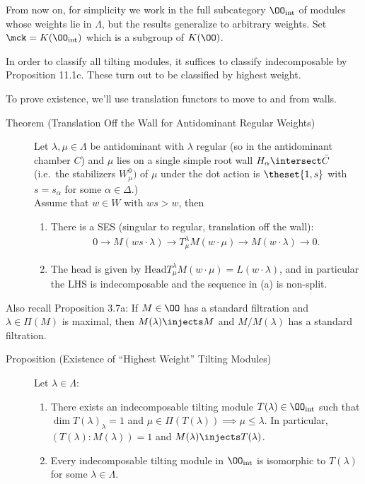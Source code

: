 From now on, for simplicity we work in the full subcategory
\(\OO_{\text{int}}\) of modules whose weights lie in \(\Lambda\), but
the results generalize to arbitrary weights. Set
\(\mck = K(\OO_{\text{int}})\) which is a subgroup of \(K(\OO)\).

In order to classify all tilting modules, it suffices to classify
indecomposable by Proposition 11.1c. These turn out to be classified by
highest weight.

To prove existence, we'll use translation functors to move to and from
walls.

\begin{description}
\item[Theorem (Translation Off the Wall for Antidominant Regular
Weights)]
Let \(\lambda, \mu \in \Lambda\) be antidominant with \(\lambda\)
regular (so in the antidominant chamber \(C\)) and \(\mu\) lies on a
single simple root wall \(H_\alpha \intersect \bar C\) (i.e.~the
stabilizers \(W_\mu^0)\) of \(\mu\) under the dot action is
\(\theset{1, s}\) with \(s = s_\alpha\) for some
\(\alpha \in \Delta\).)\\
Assume that \(w\in W\) with \(ws > w\), then

\begin{enumerate}
\def\labelenumi{\alph{enumi}.}
\tightlist
\item
  There is a SES (singular to regular, translation off the wall):
  \begin{align*} 0 \to M(ws \cdot \lambda ) \to T_{\mu}^\lambda M(w\cdot \mu) \to M(w\cdot \lambda) \to 0.\end{align*}
\item
  The head is given by
  \(\text{Head} T_{\mu}^\lambda M(w\cdot \mu) = L(w\cdot \lambda)\), and
  in particular the LHS is indecomposable and the sequence in (a) is
  non-split.
\end{enumerate}
\end{description}

Also recall Proposition 3.7a: If \(M\in \OO\) has a standard filtration
and \(\lambda \in \Pi(M)\) is maximal, then \(M(\lambda) \injects M\)
and \(M/M(\lambda)\) has a standard filtration.

\begin{description}
\item[Proposition (Existence of ``Highest Weight'' Tilting Modules)]
Let \(\lambda \in \Lambda\):

\begin{enumerate}
\def\labelenumi{\alph{enumi}.}
\tightlist
\item
  There exists an indecomposable tilting module
  \(T(\lambda) \in \OO_{\text{int}}\) such that
  \(\dim T(\lambda)_\lambda = 1\) and
  \(\mu \in \Pi(T(\lambda)) \implies \mu \leq \lambda\). In particular,
  \(( T(\lambda): M(\lambda) ) = 1\) and
  \(M(\lambda) \injects T(\lambda)\).
\item
  Every indecomposable tilting module in \(\OO_{\text{int}}\) is
  isomorphic to \(T(\lambda)\) for some \(\lambda \in \Lambda\).
\end{enumerate}
\end{description}

